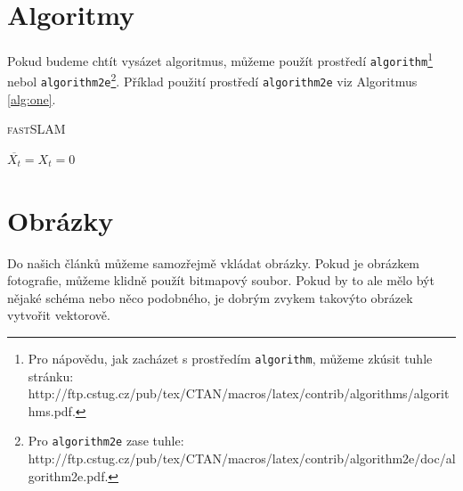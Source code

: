 \documentclass[11pt,a4paper]{article}
\begin{document}
\section{Algoritmy}\label{sec3}

Pokud budeme chtít vysázet algoritmus, můžeme použít prostředí \verb|algorithm|\footnote{Pro nápovědu, jak zacházet s prostředím \texttt{algorithm}, můžeme zkúsit tuhle stránku: \newline http://ftp.cstug.cz/pub/tex/CTAN/macros/latex/contrib/algorithms/algorithms.pdf.} nebol \verb|algorithm2e|\footnote{Pro \texttt{algorithm2e} zase tuhle: http://ftp.cstug.cz/pub/tex/CTAN/macros/latex/contrib/algorithm2e/doc/algorithm2e.pdf.}. Příklad použití prostředí \verb|algorithm2e| viz Algoritmus \ref{alg:one}.

\begin{algorithm}\label{alg:one}
\caption{\textsc{fastSLAM}}
\DontPrintSemicolon
{}
\SetNlSkip{-1.20em}
\SetNlSty{}{}{:}	
\SetAlgoNoLine
\Indp
\BlankLine
$\overline{X_t}=X_t=0$\;
\end{algorithm}

\section{Obrázky}

Do našich článků můžeme samozřejmě vkládat obrázky. Pokud je obrázkem fotografie, můžeme klidně použít bitmapový soubor. Pokud by to ale mělo být nějaké schéma nebo něco podobného, je dobrým zvykem takovýto obrázek vytvořit vektorově.
\end{document}
